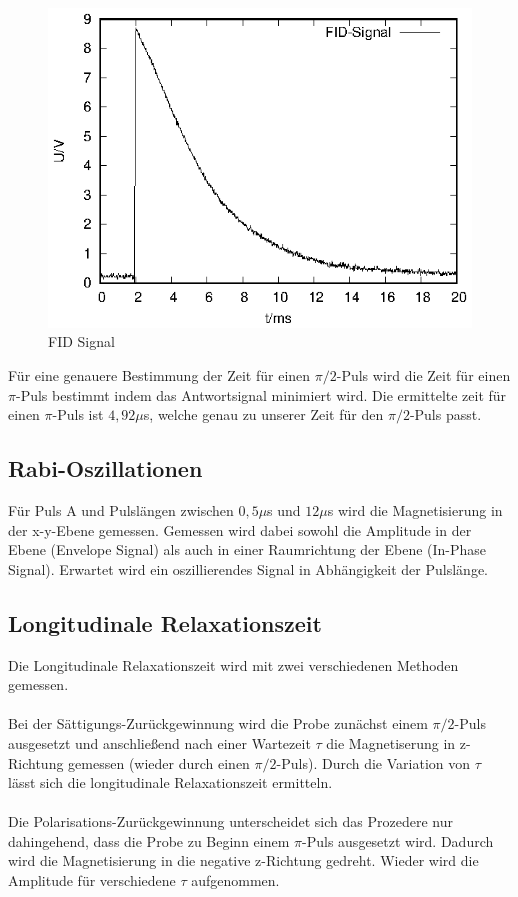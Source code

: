 \begin{figure}[h]
  \centering
  \includegraphics[width=0.75\linewidth]{data/p402_443_data/FID_1/FID_1.eps}
  \caption{FID Signal}
  \label{fig:FID}
\end{figure}
Für eine genauere Bestimmung der Zeit für einen $\pi/2$-Puls wird die Zeit für einen $\pi$-Puls bestimmt indem das Antwortsignal minimiert wird. Die ermittelte zeit für einen $\pi$-Puls ist $4,92\mu$s, welche genau zu unserer Zeit für den $\pi/2$-Puls passt.

\subsection{Rabi-Oszillationen}
Für Puls A und Pulslängen zwischen $0,5\mu$s und $12\mu$s wird die Magnetisierung in der x-y-Ebene gemessen. Gemessen wird dabei sowohl die Amplitude in der Ebene (Envelope Signal) als auch in einer Raumrichtung der Ebene (In-Phase Signal). Erwartet wird ein oszillierendes Signal in Abhängigkeit der Pulslänge. 

\subsection{Longitudinale Relaxationszeit}
Die Longitudinale Relaxationszeit wird mit zwei verschiedenen Methoden gemessen. \\ \\
Bei der Sättigungs-Zurückgewinnung wird die Probe zunächst einem $\pi/2$-Puls ausgesetzt und anschließend nach einer Wartezeit $\tau$ die Magnetiserung in z-Richtung gemessen (wieder durch einen $\pi/2$-Puls). Durch die Variation von $\tau$ lässt sich die longitudinale Relaxationszeit ermitteln. \\ \\
Die Polarisations-Zurückgewinnung unterscheidet sich das Prozedere nur dahingehend, dass die Probe zu Beginn einem $\pi$-Puls ausgesetzt wird. Dadurch wird die Magnetisierung in die negative z-Richtung gedreht. Wieder wird die Amplitude für verschiedene $\tau$ aufgenommen.

